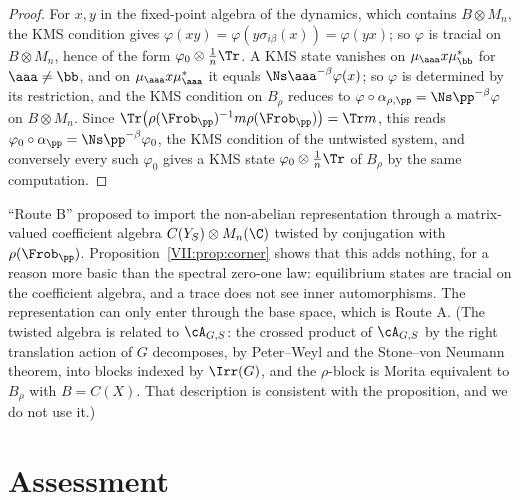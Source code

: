 \begin{proof}
For $x,y$ in the fixed-point algebra of the dynamics, which contains $B\otimes M_n$, the KMS
condition gives $\varphi(xy)=\varphi(y\sigma_{i\beta}(x))=\varphi(yx)$; so $\varphi$ is
tracial on $B\otimes M_n$, hence of the form $\varphi_0\otimes\frac1n\Tr$. A KMS state
vanishes on $\mu_\aaa x\mu_\bb^*$ for $\aaa\ne\bb$, and on $\mu_\aaa x\mu_\aaa^*$ it
equals $\Ns\aaa^{-\beta}\varphi(x)$; so $\varphi$ is determined by its restriction, and
the KMS condition on $B_\rho$ reduces to $\varphi\circ\alpha_{\rho,\pp}=\Ns\pp^{-\beta}\varphi$
on $B\otimes M_n$. Since $\Tr\bigl(\rho(\Frob_\pp)^{-1}m\rho(\Frob_\pp)\bigr)=\Tr m$, this
reads $\varphi_0\circ\alpha_\pp=\Ns\pp^{-\beta}\varphi_0$, the KMS condition of the untwisted
system, and conversely every such $\varphi_0$ gives a KMS state $\varphi_0\otimes\frac1n\Tr$
of $B_\rho$ by the same computation.
\end{proof}

\begin{remark}\label{VII:rem:routeB}
``Route B'' proposed to import the non-abelian representation through a matrix-valued
coefficient algebra $C(Y_S)\otimes M_n(\C)$ twisted by conjugation with $\rho(\Frob_\pp)$.
Proposition~\ref{VII:prop:corner} shows that this adds nothing, for a reason more basic than
the spectral zero-one law: equilibrium states are tracial on the coefficient algebra, and
a trace does not see inner automorphisms. The representation can only enter through the
base space, which is Route A. (The twisted algebra is related to $\cA_{G,S}$: the crossed
product of $\cA_{G,S}$ by the right translation action of $G$ decomposes, by Peter--Weyl
and the Stone--von Neumann theorem, into blocks indexed by $\Irr(G)$, and the $\rho$-block
is Morita equivalent to $B_\rho$ with $B=C(X)$. That description is consistent with the
proposition, and we do not use it.)
\end{remark}

\section{Assessment}

